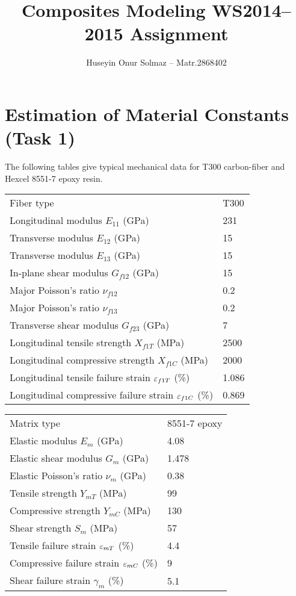 \documentclass[a4paper,twosided,12pt,DIV12]{scrartcl}
\title{Composites Modeling WS2014--2015 Assignment}
\author{Huseyin Onur Solmaz -- Matr.2868402}
\date{}
\newcommand{\veps}{\vareps}
\begin{document}
\maketitle

\section{Estimation of Material Constants (Task 1)}

The following tables give typical mechanical data for T300 carbon-fiber and
Hexcel 8551-7 epoxy resin.

\begin{table}[H]
  \centering
  \begin{minipage}{0.45\textwidth}
    \footnotesize
  \begin{tabular}{p{}p{}}
    \toprule
    Fiber type & T300\\
    Longitudinal modulus $E_{11}$ (GPa) & 231\\
    Transverse modulus $E_{12}$ (GPa) & 15\\
    Transverse modulus $E_{13}$ (GPa) & 15\\
    In-plane shear modulus $G_{f12}$ (GPa) & 15\\
    Major Poisson's ratio $\nu_{f12}$ & 0.2\\
    Major Poisson's ratio $\nu_{f13}$ & 0.2\\
    Transverse shear modulus $G_{f23}$ (GPa) & 7\\
    Longitudinal tensile strength $X_{f1T}$ (MPa) & 2500\\
    Longitudinal compressive strength $X_{f1C}$ (MPa) & 2000\\
    Longitudinal tensile failure strain $\veps_{f1T}$ (\%) & 1.086\\
    Longitudinal compressive failure strain $\veps_{f1C}$ (\%) & 0.869\\
    \bottomrule
  \end{tabular}
  \end{minipage}
  \begin{minipage}{0.45\textwidth}
    \footnotesize
  \begin{tabular}{p{}p{}}
    \toprule
    Matrix type & 8551-7 epoxy\\
    Elastic modulus $E_{m}$ (GPa) & 4.08\\
    Elastic shear modulus $G_{m}$ (GPa) & 1.478\\
    Elastic Poisson's ratio $\nu_{m}$ (GPa) & 0.38\\
    Tensile strength $Y_{mT}$ (MPa) & 99\\
    Compressive strength $Y_{mC}$ (MPa) & 130\\
    Shear strength $S_{m}$ (MPa) & 57\\
    Tensile failure strain $\veps_{mT}$ (\%) & 4.4\\
    Compressive failure strain $\veps_{mC}$ (\%) & 9\\
    Shear failure strain $\gamma_{m}$ (\%) & 5.1\\
    \bottomrule
  \end{tabular}
  \end{minipage}
\end{table}
\end{document}
